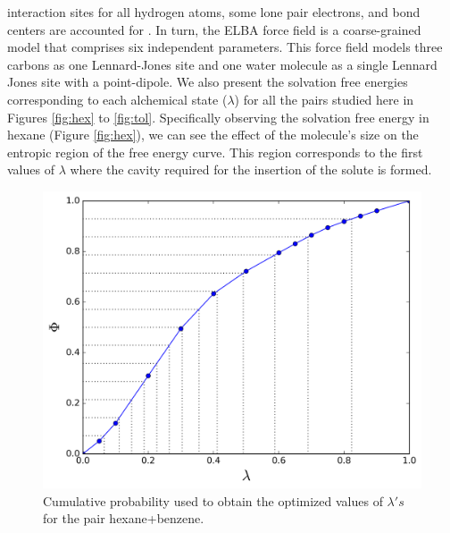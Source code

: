 \documentclass[final,12p,times,twocolumn]{elsarticle}
\begin{document}
interaction sites for all hydrogen atoms, some lone pair electrons, and bond centers are accounted for \cite{doi:10.1021/jp073586l}. In turn, the ELBA force field is a coarse-grained model that comprises six independent parameters. This force field models three carbons as one Lennard-Jones site and one water molecule as a single Lennard Jones site with a point-dipole. We also present the solvation free energies corresponding to each alchemical state ($\lambda$) for all the pairs studied here in Figures \ref{fig:hex} to \ref{fig:tol}. Specifically observing the solvation free energy in hexane (Figure \ref{fig:hex}), we can see the effect of the molecule's size on the entropic region of the free energy curve. This region corresponds to the first values of $\lambda$ where the cavity required for the insertion of the solute is formed.
	
	\begin{figure}[h]
		\centering
		\includegraphics[width=1.0\linewidth]{Figures/optimized_cdf}
		\caption{Cumulative probability used to obtain the optimized values of $\lambda 's$ for the pair hexane+benzene.}
		\label{fig:optimized_cdf}
	\end{figure}
	
\end{document}
